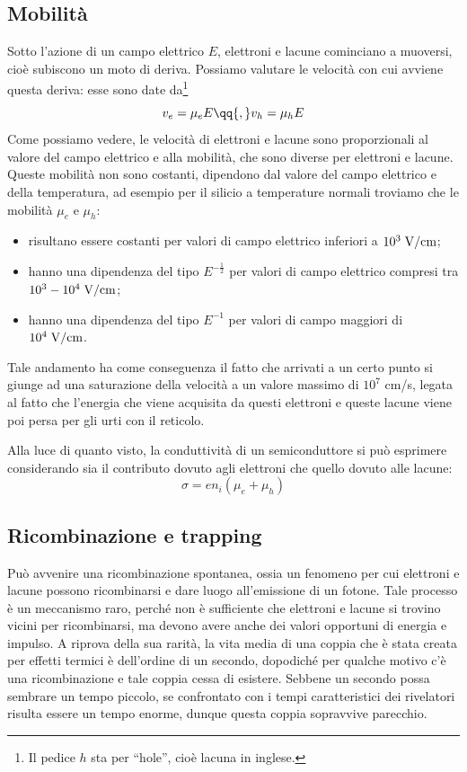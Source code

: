 \subsection{Mobilità}
Sotto l'azione di un campo elettrico $E$, elettroni e lacune cominciano a muoversi, cioè subiscono un moto di deriva. Possiamo valutare le velocità con cui avviene questa deriva: esse sono date da\footnote{Il pedice $h$ sta per ``hole'', cioè lacuna in inglese.}
\begin{equation*}
   v_e=\mu_e E
   \qq{,}
   v_h=\mu_h E
\end{equation*}
Come possiamo vedere, le velocità di elettroni e lacune sono proporzionali al valore del campo elettrico e alla mobilità, che sono diverse per elettroni e lacune. Queste mobilità non sono costanti, dipendono dal valore del campo elettrico e della temperatura, ad esempio per il silicio a temperature normali troviamo che le mobilità $\mu_e$ e $\mu_h$:
\begin{itemize}[leftmargin=0.5cm]
   \item risultano essere costanti per valori di campo elettrico inferiori a $10^3 \; \rm V/cm$;
   \item hanno una dipendenza del tipo $E^{-\frac{1}{2}}$ per valori di campo elettrico compresi tra $10^3-10^4 \; \rm V/cm$;
   \item hanno una dipendenza del tipo $E^{-1}$ per valori di campo maggiori di $10^4 \; \rm V/cm$.
\end{itemize}
Tale andamento ha come conseguenza il fatto che arrivati a un certo punto si giunge ad una saturazione della velocità a un valore massimo di $10^7$ cm/s, legata al fatto che l'energia che viene acquisita da questi elettroni e queste lacune viene poi persa per gli urti con il reticolo.

Alla luce di quanto visto, la conduttività di un semiconduttore si può esprimere considerando sia il contributo dovuto agli elettroni che quello dovuto alle lacune:
\begin{equation*}
   \sigma=e n_i (\mu_e + \mu_h)
\end{equation*}
\subsection{Ricombinazione e trapping}

Può avvenire una ricombinazione spontanea, ossia un fenomeno per cui elettroni e lacune possono ricombinarsi e dare luogo all'emissione di un fotone. Tale processo è un meccanismo raro, perché non è sufficiente che elettroni e lacune si trovino vicini per ricombinarsi, ma devono avere anche dei valori opportuni di energia e impulso. A riprova della sua rarità, la vita media di una coppia che è stata creata per effetti termici è dell'ordine di un secondo, dopodiché per qualche motivo c'è una ricombinazione e tale coppia cessa di esistere. Sebbene un secondo possa sembrare un tempo piccolo, se confrontato con i tempi caratteristici dei rivelatori risulta essere un tempo enorme, dunque questa coppia sopravvive parecchio.

